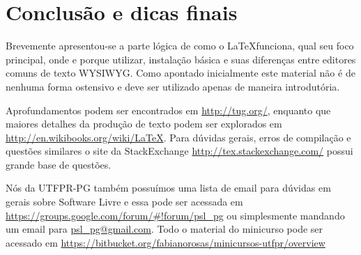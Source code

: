 \section{Conclusão e dicas finais}
Brevemente apresentou-se a parte lógica de como o \LaTeX funciona, qual seu foco principal, onde e porque utilizar, instalação básica e suas diferenças entre editores comuns de texto WYSIWYG. Como apontado inicialmente este material não é de nenhuma forma ostensivo e deve ser utilizado apenas de maneira introdutória.

Aprofundamentos podem ser encontrados em \url{http://tug.org/}, enquanto que maiores detalhes da produção de texto podem ser explorados em \newline\url{http://en.wikibooks.org/wiki/LaTeX}. Para dúvidas gerais, erros de compilação e questões similares o site \tex\space da \textsf{StackExchange} \url{http://tex.stackexchange.com/} possui grande base de questões.

Nós da UTFPR-PG também possuímos uma lista de email para dúvidas em gerais sobre Software Livre e essa pode ser acessada em \newline\url{https://groups.google.com/forum/#!forum/psl_pg} ou simplesmente mandando um email para \url{psl_pg@gmail.com}. Todo o material do minicurso pode ser acessado em \url{https://bitbucket.org/fabianorosas/minicursos-utfpr/overview}
